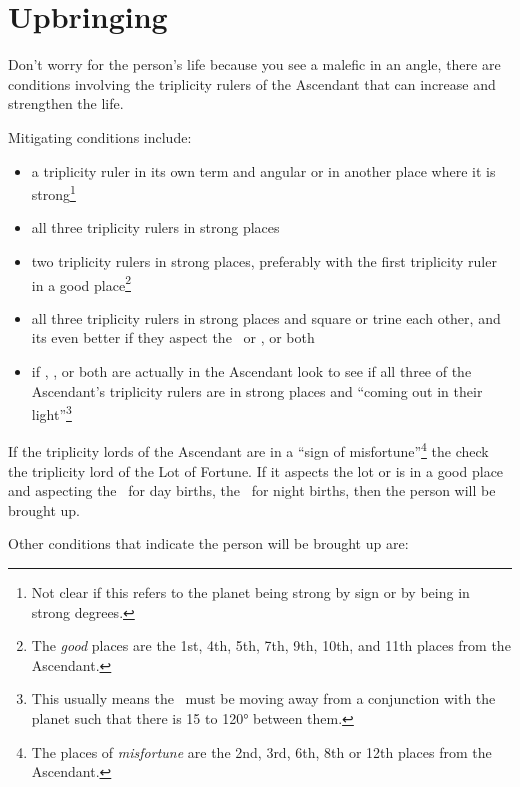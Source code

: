 \section{Upbringing}

Don't worry for the person's life because you see a malefic in an angle, there are conditions involving the triplicity rulers of the Ascendant that can increase and strengthen the life. 

Mitigating conditions include:
\begin{itemize}[topsep=0pt,itemsep=0pt]

\item a triplicity ruler in its own term and angular or in another place where it is strong\footnote{Not clear if this refers to the planet being strong by sign or by being in strong degrees.}

\item all three triplicity rulers in strong places

\item two triplicity rulers in strong places, preferably with the first triplicity ruler in a good place\footnote{The \textsl{good} places are the 1st, 4th, 5th, 7th, 9th, 10th, and 11th places from the Ascendant.}

\item all three triplicity rulers in strong places and square or trine each other, and its even better if they aspect the \Sun\, or \Moon, or both 

\item if \Saturn, \Mars, or both are actually in the Ascendant look to see if all three of the Ascendant's triplicity rulers are in strong places and ``coming out in their light''\footnote{This usually means the \Sun\, must be moving away from a conjunction with the planet such that there is 15 to 120° between them.}
\end{itemize}

If the triplicity lords of the Ascendant are in a ``sign of misfortune''\footnote{The places of \textsl{misfortune} are the 2nd, 3rd, 6th, 8th or 12th places from the Ascendant.} the check the triplicity lord of the Lot of Fortune. If it aspects the lot or is in a good place and aspecting the \Sun\, for day births, the \Moon\, for night births, then the person will be brought up.

Other conditions that indicate the person will be brought up are:

